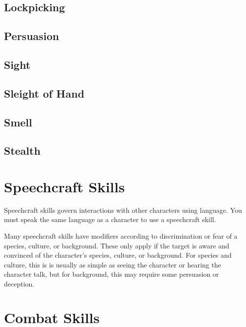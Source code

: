 \begin{multicols*}{2}
    \subsection{Lockpicking}\label{skill:lockpicking}

    \subsection{Persuasion}\label{skill:persuasion}

    \subsection{Sight}\label{skill:sight}

    \subsection{Sleight of Hand}\label{skill:sleight-of-hand}

    \subsection{Smell}\label{skill:smell}

    \subsection{Stealth}\label{skill:stealth}

    \section{Speechcraft Skills}\label{speechcraft-skills}
    Speechcraft skills govern interactions with other characters using language.
    You must speak the same language as a character to use a speechcraft skill.

    Many speechcraft skills have modifiers according to discrimination or fear of
    a species, culture, or background. These only apply if the target is aware and
    convinced of the character's species, culture, or background. For species and
    culture, this is is usually as simple as seeing the character or hearing the
    character talk, but for background, this may require some persuasion or
    deception.

    \section{Combat Skills}


\end{multicols*}
